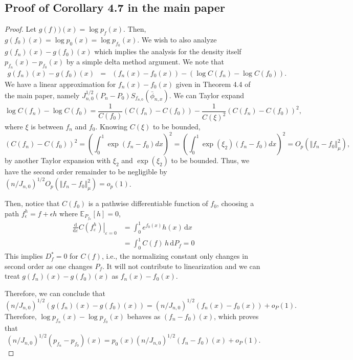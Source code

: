 \subsection{Proof of Corollary 4.7 in the main paper}
\begin{proof}
Let $g(f))(x)=\log p_f(x)$. Then, $g(f_0)(x)=\log p_0(x)=\log p_{f_0}(x)$. We wish to also analyze $g(f_n)(x)-g(f_0)(x)$ which implies the analysis for the density itself $p_{f_n}(x)-p_{f_0}(x)$ by a simple delta method argument. 
We note that
\begin{eqnarray*}
g(f_n)(x)-g(f_0)(x)&=& (f_n(x)-f_0(x))-(\log C(f_n)-\log C(f_0)).
\end{eqnarray*}
We have a linear approximation for $f_n(x)-f_0(x)$ given in Theorem 4.4 of the main paper, namely $J_{n,0}^{1/2}(P_n-P_0)S_{f_{n,0} }(\bar{\phi}_{n,x})$. We can Taylor expand
\[
\log C(f_n)-\log C(f_0) = \frac{1}{C(f_0)}(C(f_n)-C(f_0)) - \frac{1}{C(\xi)^2}(C(f_n) - C(f_0))^2,
\]
where $\xi$ is between $f_n$ and $f_0$. Knowing $C(\xi)$ to be bounded,
\[
(C(f_n) - C(f_0))^2 = (\int_0^1 \exp(f_n - f_0) dx)^2 = (\int_0^1 \exp(\xi_2)(f_n - f_0) dx)^2 = O_p(\Vert f_n - f_0 \Vert_{\mu}^2),
\]
by another Taylor expansion with $\xi_2$ and $\exp(\xi_2)$ to be bounded. Thus, we have the second order remainder to be negligible by $(n/J_{n,0})^{1/2}O_p(\Vert f_n - f_0 \Vert_{\mu}^2) = o_p(1)$.

Then, notice that $C(f_0)$ is a pathwise differentiable function of $f_0$, choosing a path $f_{\epsilon}^h = f + \epsilon h$ where $\mathbb{E}_{P_{f_n}}[h] = 0$, 
\begin{align*}
    \left.\frac{\mathrm{d}}{\mathrm{d}\varepsilon} C(f_\varepsilon^h)\right|_{\varepsilon=0} &= \int_0^1 e^{f_0(x)} h(x) \, \mathrm{d}x \\
    &= \int_0^1  C(f) \, h\, \mathrm{d}P_f =0
\end{align*}
This implies $D^*_f =0$ for $C(f)$, i.e., the normalizing constant only changes in second order as one changes $P_{f}$. It will not contribute to linearization and we can treat $g(f_n)(x)-g(f_0)(x)$ as $f_n(x)-f_0(x)$.

Therefore, we can conclude that
\[
(n/J_{n,0})^{1/2}( g(f_n)(x)-g(f_0)(x))=(n/J_{n,0})^{1/2}(f_n(x)-f_0(x))+o_P(1).\]
Therefore, $\log p_{f_n}(x)-\log p_{f_0}(x)$ behaves as $(f_n-f_0)(x)$, which proves that 
\[
(n/J_{n,0})^{1/2}(p_{f_n}-p_{f_0})(x)=p_0(x)(n/J_{n,0})^{1/2}(f_n-f_0)(x)+o_P(1).
\]
\end{proof}